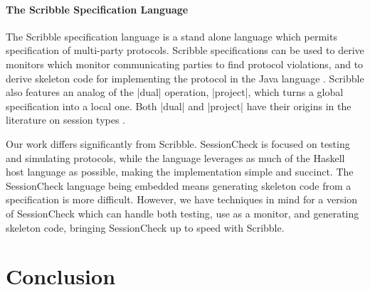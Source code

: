 \documentclass{article}
\begin{document}
\paragraph{The Scribble Specification Language}
%
The Scribble specification language \cite{Scribble} is a stand alone language
which permits specification of multi-party protocols.
%
Scribble specifications can be used to derive monitors which monitor communicating
parties to find protocol violations, and to derive skeleton code for implementing
the protocol in the Java language \cite{Java}.
%
Scribble also features an analog of the |dual| operation, |project|, which turns a
global specification into a local one.
%
Both |dual| and |project| have their origins in the literature on session types
\cite{HondaSessionTypes, WadlerSessionTypes}.

Our work differs significantly from Scribble.
%
SessionCheck is focused on testing and simulating protocols, while the language
leverages as much of the Haskell host language as possible, making the implementation
simple and succinct.
%
The SessionCheck language being embedded means generating skeleton code from a
specification is more difficult.
%
However, we have techniques in mind for a version of SessionCheck which can handle
both testing, use as a monitor, and generating skeleton code, bringing SessionCheck
up to speed with Scribble.
%

\section{Conclusion}




\end{document}
